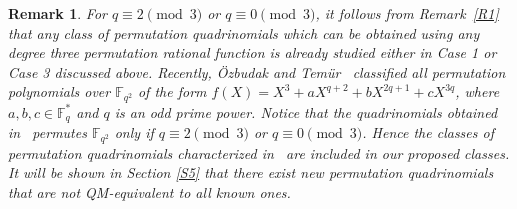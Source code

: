 \documentclass[12pt]{amsart}
\newtheorem{thm}{Theorem}[section]
\newtheorem{rmk}[thm]{Remark}
\numberwithin{equation}{section}
\theoremstyle{definition}
\newcommand{\F}{\mathbb F}
\begin{document}
\begin{rmk}
For $q \equiv 2 \pmod 3$ or $q \equiv 0 \pmod 3$, it follows from Remark~\ref{R1} that any class of permutation quadrinomials which can be obtained using any degree three permutation rational function is already studied either in Case 1 or Case 3 discussed above. Recently, {\"O}zbudak and Tem{\"u}r~\cite{FB_quad_2023} classified all permutation polynomials over $\F_{q^2}$ of the form $f(X) = X^3 + aX^{q+2} +bX^{2q+1} + cX^{3q}$, where $a, b, c \in \F_{q}^*$ and $q$ is an odd prime power. Notice that the quadrinomials obtained in~\cite{FB_quad_2023} permutes $\F_{q^2}$ only if $q \equiv 2 \pmod 3$ or $q \equiv 0 \pmod 3$. Hence the classes of permutation quadrinomials characterized in~\cite{FB_quad_2023} are included in our proposed classes.
It will be shown in Section \ref{S5} that there exist new permutation quadrinomials that are not QM-equivalent to all known ones.
\end{rmk}
\end{document}
